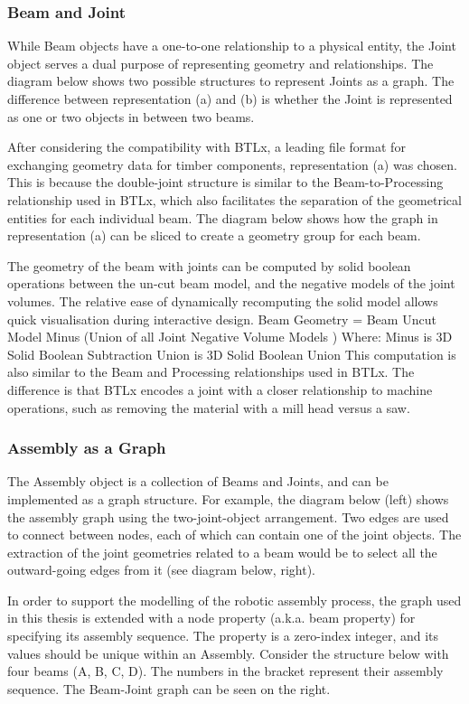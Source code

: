 \begin{itemize}
\subsubsection{Beam and Joint}
While Beam objects have a one-to-one relationship to a physical entity, the Joint object serves a dual purpose of representing geometry and relationships. The diagram below shows two possible structures to represent Joints as a graph. The difference between representation (a) and (b) is whether the Joint is represented as one or two objects in between two beams.

After considering the compatibility with BTLx, a leading file format for exchanging geometry data for timber components, representation (a) was chosen. This is because the double-joint structure is similar to the Beam-to-Processing relationship used in BTLx, which also facilitates the separation of the geometrical entities for each individual beam. The diagram below shows how the graph in representation (a) can be sliced to create a geometry group for each beam.

The geometry of the beam with joints can be computed by solid boolean operations between the un-cut beam model, and the negative models of the joint volumes. The relative ease of dynamically recomputing the solid model allows quick visualisation during interactive design.
Beam Geometry = Beam Uncut Model Minus (Union of all Joint Negative Volume Models )
Where: 
Minus is 3D Solid Boolean Subtraction
Union is 3D Solid Boolean Union
This computation is also similar to the Beam and Processing relationships used in BTLx. The difference is that BTLx encodes a joint with a closer relationship to machine operations, such as removing the material with a mill head versus a saw.

\subsubsection{Assembly as a Graph}
The Assembly object is a collection of Beams and Joints, and can be implemented as a graph structure. For example, the diagram below (left) shows the assembly graph using the two-joint-object arrangement. Two edges are used to connect between nodes, each of which can contain one of the joint objects. The extraction of the joint geometries related to a beam would be to select all the outward-going edges from it (see diagram below, right).

In order to support the modelling of the robotic assembly process, the graph used in this thesis is extended with a node property (a.k.a. beam property) for specifying its assembly sequence. The property is a zero-index integer, and its values should be unique within an Assembly. Consider the structure below with four beams (A, B, C, D). The numbers in the bracket represent their assembly sequence. The Beam-Joint graph can be seen on the right.


\end{itemize}
